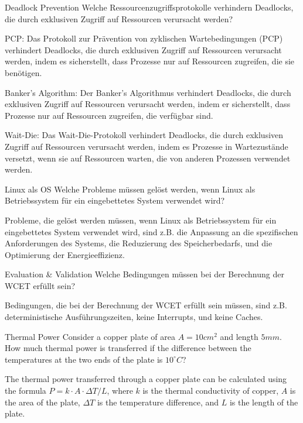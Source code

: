 \documentclass{article}
\begin{document}
\begin{exercise}{Deadlock Prevention}
  Welche Ressourcenzugriffsprotokolle verhindern Deadlocks, die durch exklusiven Zugriff auf Ressourcen verursacht werden?

  \begin{solution}
    PCP: Das Protokoll zur Prävention von zyklischen Wartebedingungen (PCP) verhindert Deadlocks, die durch exklusiven Zugriff auf Ressourcen verursacht werden, indem es sicherstellt, dass Prozesse nur auf Ressourcen zugreifen, die sie benötigen.

    Banker's Algorithm: Der Banker's Algorithmus verhindert Deadlocks, die durch exklusiven Zugriff auf Ressourcen verursacht werden, indem er sicherstellt, dass Prozesse nur auf Ressourcen zugreifen, die verfügbar sind.

    Wait-Die: Das Wait-Die-Protokoll verhindert Deadlocks, die durch exklusiven Zugriff auf Ressourcen verursacht werden, indem es Prozesse in Wartezustände versetzt, wenn sie auf Ressourcen warten, die von anderen Prozessen verwendet werden.
  \end{solution}
\end{exercise}

\begin{exercise}{Linux als OS}
  Welche Probleme müssen gelöst werden, wenn Linux als Betriebssystem für ein eingebettetes System verwendet wird?

  \begin{solution}
    Probleme, die gelöst werden müssen, wenn Linux als Betriebssystem für ein eingebettetes System verwendet wird, sind z.B. die Anpassung an die spezifischen Anforderungen des Systems, die Reduzierung des Speicherbedarfs, und die Optimierung der Energieeffizienz.
  \end{solution}
\end{exercise}


\begin{exercise}{Evaluation \& Validation}
  Welche Bedingungen müssen bei der Berechnung der WCET erfüllt sein?

  \begin{solution}
    Bedingungen, die bei der Berechnung der WCET erfüllt sein müssen, sind z.B. deterministische Ausführungszeiten, keine Interrupts, und keine Caches.
  \end{solution}
\end{exercise}

\begin{exercise}{Thermal Power}
  Consider a copper plate of area $A=10cm^2$ and length $5mm$. How much thermal power is transferred if the difference between the temperatures at the two ends of the plate is $10^\circ C$?

  \begin{solution}
    The thermal power transferred through a copper plate can be calculated using the formula $P = k \cdot A \cdot \Delta T / L$, where $k$ is the thermal conductivity of copper, $A$ is the area of the plate, $\Delta T$ is the temperature difference, and $L$ is the length of the plate.
  \end{solution}
\end{exercise}
\end{document}
